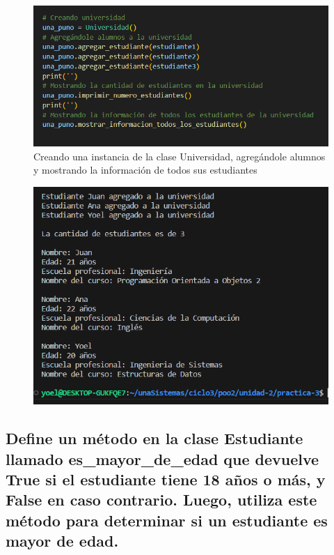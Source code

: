 \documentclass[11pt,a4paper]{article}
\begin{document}
\begin{figure}[H]
    \centering
    \includegraphics[width=1\linewidth]{images/7.png}
    \caption{Creando una instancia de la clase Universidad, agregándole alumnos y mostrando la información de todos sus estudiantes}
    \label{fig:enter-label}
\end{figure}

\begin{figure}[H]
    \centering
    \includegraphics[width=1\linewidth]{images/8.png}
    \caption{}
    \label{fig:enter-label}
\end{figure}

\subsection{Define un método en la clase Estudiante llamado es\_mayor\_de\_edad que devuelve True si el estudiante tiene 18 años o más, y False en caso contrario. Luego, utiliza este método para determinar si un estudiante es mayor de edad.}
\end{document}
